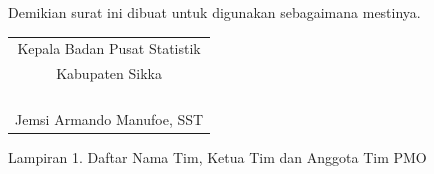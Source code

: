 \documentclass{article}
\begin{document}
Demikian surat ini dibuat untuk digunakan sebagaimana mestinya.

\bigskip
\hfill
\begin{tabular}{@{}c}
Kepala Badan Pusat Statistik\\
Kabupaten Sikka \bigskip\\
\\
\\
\\
\\
Jemsi Armando Manufoe, SST
\end{tabular}



\newpage

Lampiran 1. Daftar Nama Tim, Ketua Tim dan Anggota Tim PMO

\end{document}
